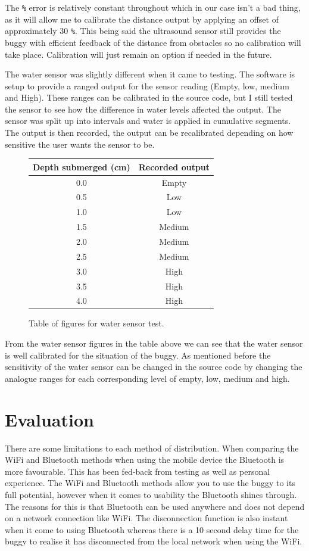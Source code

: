 \documentclass[8pt, a4paper]{article}
\begin{document}
The \verb|%| error is relatively constant throughout which in our case isn't a bad thing, as it will allow me to calibrate the distance output by applying an offset of approximately 30 \verb|%|. This being said the ultrasound sensor still provides the buggy with efficient feedback of the distance from obstacles so no calibration will take place. Calibration will just remain an option if needed in the future.  


The water sensor was slightly different when it came to testing. The software is setup to provide a ranged output for the sensor reading (Empty, low, medium and High). These ranges can be calibrated in the source code, but I still tested the sensor to see how the difference in water levels affected the output. The sensor was split up into intervals and water is applied in cumulative segments. The output is then recorded, the output can be recalibrated depending on how sensitive the user wants the sensor to be. 


\begin{figure}[H]
	\centering
	\begin{tabular}{|c|c|}
		\hline
		Depth submerged (cm) & Recorded output\\
		\hline
        0.0 & Empty\\
        0.5 & Low\\
        1.0 & Low\\
        1.5 & Medium\\
        2.0 & Medium\\
        2.5 & Medium\\
        3.0 & High\\
        3.5 & High\\
        4.0 & High\\
		\hline
	\end{tabular}
	\caption{Table of figures for water sensor test.}
\end{figure}
From the water sensor figures in the table above we can see that the water sensor is well calibrated for the situation of the buggy. As mentioned before the sensitivity of the water sensor can be changed in the source code by changing the analogue ranges for each corresponding level of empty, low, medium and high. 


\section{Evaluation}

There are some limitations to each method of distribution. When comparing the WiFi and Bluetooth methods when using the mobile device the Bluetooth is more favourable. This has been fed-back from testing as well as personal experience. The WiFi and Bluetooth methods allow you to use the buggy to its full potential, however when it comes to usability the Bluetooth shines through. The reasons for this is that Bluetooth can be used anywhere and does not depend on a network connection like WiFi. The disconnection function is also instant when it come to using Bluetooth whereas there is a 10 second delay time for the buggy to realise it has disconnected from the local network when using the WiFi. 
\end{document}
